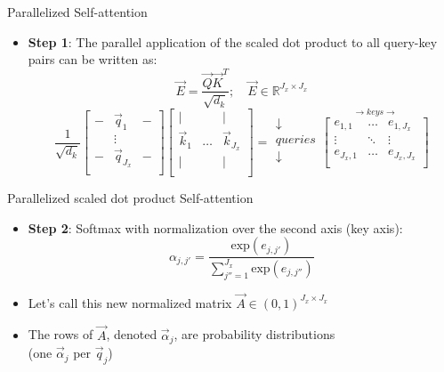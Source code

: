 \documentclass[11pt,compress,t,notes=noshow, xcolor=table]{beamer}
\begin{document}
\begin{vbframe}{Parallelized Self-attention}

\vfill

\begin{itemize}
\item \textbf{Step 1}: The parallel application of the scaled dot product to all query-key pairs can be written as:
$$\vec {E} = \frac{ \vec {Q} \vec {K}^T}{\sqrt{d_k}}; \quad \vec E \in \mathbb{R}^{J_x \times J_x}$$
$$ \frac{1}{\sqrt{d_k}}
\begin{bmatrix} 
- & \vec q_1  & -  \\
& \vdots & \\
-  & \vec q_{J_x}  &  -  \\
\end{bmatrix}  
\begin{bmatrix} 
\lvert &  & \lvert  \\
\vec k_1 & \ldots & \vec k_{J_x} \\
\lvert &  & \lvert  \\
\end{bmatrix}
= 
\begin{matrix} \downarrow \\ queries \\ \downarrow \\ \end{matrix} \overset{\rightarrow keys \rightarrow}{
\begin{bmatrix}
e_{1,1} & \ldots & e_{1,J_x} \\
\vdots & \ddots & \vdots \\
e_{J_x,1} & \ldots & e_{J_x,J_x} \\
\end{bmatrix}}$$
\end{itemize}

\vfill

\end{vbframe}


\begin{vbframe}{Parallelized scaled dot product Self-attention}

\vfill

\begin{itemize}
\item \textbf{Step 2}: Softmax with normalization over the second axis (key axis): 
$$\alpha_{j,j'} = \frac{\mathrm{exp}(e_{j,j'})}{\sum_{j''=1}^{J_x} \mathrm{exp}(e_{j,j''})}$$
\item Let's call this new normalized matrix $\vec A \in (0,1)^{J_x \times J_x}$
\item The rows of $\vec A$, denoted $\vec \alpha_j$, are probability distributions\\ (one $\vec \alpha_j$ per $\vec q_j$)
\end{itemize}

\vfill

\end{vbframe}
\end{document}
